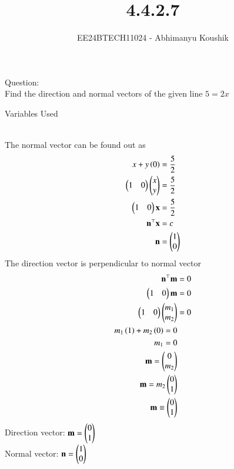 \documentclass[journal]{IEEEtran}
\begin{document}

\vspace{3cm}

\title{4.4.2.7}
\author{EE24BTECH11024 - Abhimanyu Koushik}
{\let\newpage\relax\maketitle}
Question:\\
Find the direction and normal vectors of the given line $5=2x$
\begin{table}[h!]    
  \centering
  
  \caption{Variables Used}
  \label{tab1-1.9-6}
\end{table}\\
\solution
The normal vector can be found out as
\begin{align}
x+y\left(0\right)&=\frac{5}{2}\\
\begin{pmatrix}1 & 0\end{pmatrix}\begin{pmatrix}x\\y\end{pmatrix}&=\frac{5}{2}\\
\begin{pmatrix}1&0\end{pmatrix}\mathbf{x}&=\frac{5}{2}\\
\mathbf{n}^\top\mathbf{x}&=c\\
\mathbf{n}&=\begin{pmatrix}1\\0\end{pmatrix}
\end{align}
The direction vector is perpendicular to normal vector
\begin{align}
\mathbf{n}^\top\mathbf{m}&=0\\
\begin{pmatrix}1 & 0\end{pmatrix}\mathbf{m}&=0\\
\begin{pmatrix}1 & 0\end{pmatrix}\begin{pmatrix}m_1\\m_2\end{pmatrix}&=0\\
m_1\left(1\right)+m_2\left(0\right)=0\\
m_1=0\\
\mathbf{m}=\begin{pmatrix}0\\m_2\end{pmatrix}\\
\mathbf{m}=m_2\begin{pmatrix}0\\1\end{pmatrix}\\
\mathbf{m}\equiv\begin{pmatrix}0\\1\end{pmatrix}
\end{align}
Direction vector: $\mathbf{m}=\begin{pmatrix}0\\1\end{pmatrix}$\\
Normal vector: $\mathbf{n}=\begin{pmatrix}1\\0\end{pmatrix}$
\end{document}
